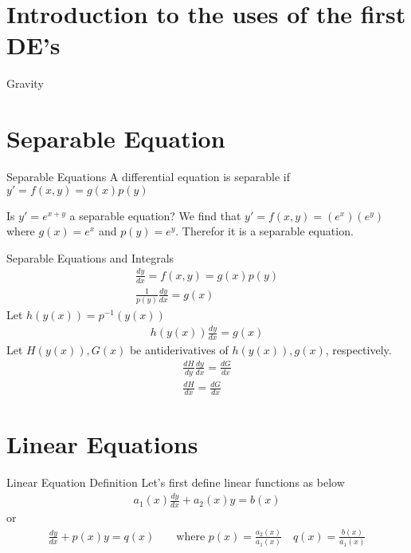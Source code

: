 \section{Introduction to the uses of the first DE's}

\begin{example}{Gravity}{}
    
\end{example}

\section{Separable Equation}

\begin{definition}{Separable Equations}{}
    A differential equation is separable if $y'=f(x,y)=g(x)p(y)$
\end{definition}

\begin{example}{Is $y'=e^{x+y}$ a separable equation?}{}
    We find that $y'=f(x,y)=(e^x)(e^y)$ where $g(x)=e^x$ and $p(y)=e^y$. Therefor it is a separable equation.
\end{example}

\begin{definition}{Separable Equations and Integrals}{}
    \begin{gather}
        \frac{dy}{dx}=f(x,y)=g(x)p(y) \\
        \frac 1{p(y)} \frac{dy}{dx} = g(x)
    \end{gather}
    Let $h(y(x))=p^{-1}(y(x))$
    \begin{gather}
        h(y(x))\frac{dy}{dx}=g(x)
    \end{gather}
    Let $H(y(x)), G(x)$ be antiderivatives of $h(y(x)), g(x)$, respectively.
    \begin{gather}
        \frac{dH}{dy}\frac{dy}{dx}=\frac{dG}{dx} \\
        \frac{dH}{dx}=\frac{dG}{dx}
    \end{gather}
\end{definition}

\section{Linear Equations}

\begin{definition}{Linear Equation Definition}{}
    Let's first define linear functions as below
    \begin{gather*}
        a_1(x)\frac{dy}{dx} + a_2(x)y = b(x)
    \end{gather*}
    or
    \begin{align*}
        \frac{dy}{dx} + p(x)y = q(x) && \text{ where } p(x) = \frac{a_2(x)}{a_1(x)} \quad q(x) = \frac{b(x)}{a_1(x)}
    \end{align*}
\end{definition}

